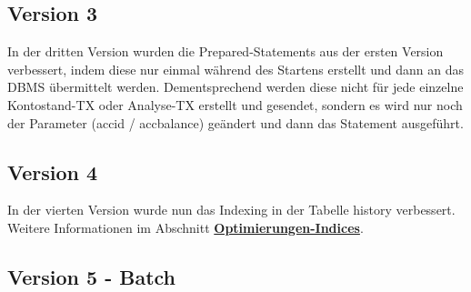 \subsection{Version 3}\label{subsec:version3}
In der dritten Version wurden die Prepared-Statements aus der ersten Version verbessert, indem diese nur einmal während des Startens erstellt und dann an das DBMS übermittelt werden.
Dementsprechend werden diese nicht für jede einzelne Kontostand-TX oder Analyse-TX erstellt und gesendet, sondern es wird nur noch der Parameter (accid / accbalance) geändert und dann das Statement ausgeführt.




\subsection{Version 4}\label{subsec:version4}
In der vierten Version wurde nun das Indexing in der Tabelle history verbessert.
Weitere Informationen im Abschnitt \hyperref[sec:optimierungen]{\textbf{Optimierungen-Indices}}.

\subsection{Version 5 - Batch}\label{subsec:version5-batch}